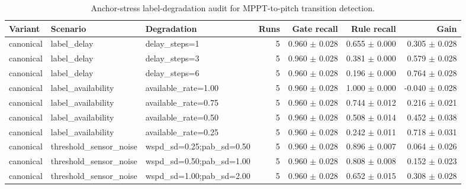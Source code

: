 \begin{table}[H]
\centering
\footnotesize
\setlength{\tabcolsep}{4pt}
\renewcommand{\arraystretch}{1.08}
\caption{Anchor-stress label-degradation audit for MPPT-to-pitch transition detection.}
\begin{tabular}{lllrrrr}
\toprule
Variant & Scenario & Degradation & Runs & Gate recall & Rule recall & Gain \\
\midrule
canonical & label\_delay & delay\_steps=1 & 5 & 0.960 $\pm$ 0.028 & 0.655 $\pm$ 0.000 & 0.305 $\pm$ 0.028 \\
canonical & label\_delay & delay\_steps=3 & 5 & 0.960 $\pm$ 0.028 & 0.381 $\pm$ 0.000 & 0.579 $\pm$ 0.028 \\
canonical & label\_delay & delay\_steps=6 & 5 & 0.960 $\pm$ 0.028 & 0.196 $\pm$ 0.000 & 0.764 $\pm$ 0.028 \\
canonical & label\_availability & available\_rate=1.00 & 5 & 0.960 $\pm$ 0.028 & 1.000 $\pm$ 0.000 & -0.040 $\pm$ 0.028 \\
canonical & label\_availability & available\_rate=0.75 & 5 & 0.960 $\pm$ 0.028 & 0.744 $\pm$ 0.012 & 0.216 $\pm$ 0.021 \\
canonical & label\_availability & available\_rate=0.50 & 5 & 0.960 $\pm$ 0.028 & 0.508 $\pm$ 0.014 & 0.452 $\pm$ 0.038 \\
canonical & label\_availability & available\_rate=0.25 & 5 & 0.960 $\pm$ 0.028 & 0.242 $\pm$ 0.011 & 0.718 $\pm$ 0.031 \\
canonical & threshold\_sensor\_noise & wspd\_sd=0.25;pab\_sd=0.50 & 5 & 0.960 $\pm$ 0.028 & 0.896 $\pm$ 0.007 & 0.064 $\pm$ 0.026 \\
canonical & threshold\_sensor\_noise & wspd\_sd=0.50;pab\_sd=1.00 & 5 & 0.960 $\pm$ 0.028 & 0.808 $\pm$ 0.008 & 0.152 $\pm$ 0.023 \\
canonical & threshold\_sensor\_noise & wspd\_sd=1.00;pab\_sd=2.00 & 5 & 0.960 $\pm$ 0.028 & 0.652 $\pm$ 0.015 & 0.308 $\pm$ 0.028 \\
\bottomrule
\end{tabular}
\end{table}
